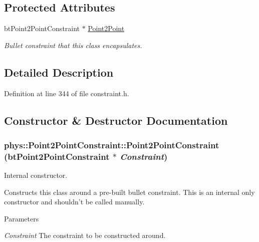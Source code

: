 \subsection*{Protected Attributes}
\begin{DoxyCompactItemize}
\item 
\hypertarget{classphys_1_1Point2PointConstraint_aa58b7fd9fe368c72d5bc5e1990bdf593}{
btPoint2PointConstraint $\ast$ \hyperlink{classphys_1_1Point2PointConstraint_aa58b7fd9fe368c72d5bc5e1990bdf593}{Point2Point}}
\label{da/dfb/classphys_1_1Point2PointConstraint_aa58b7fd9fe368c72d5bc5e1990bdf593}

\begin{DoxyCompactList}\small\item\em Bullet constraint that this class encapsulates. \item\end{DoxyCompactList}\end{DoxyCompactItemize}


\subsection{Detailed Description}


Definition at line 344 of file constraint.h.



\subsection{Constructor \& Destructor Documentation}
\hypertarget{classphys_1_1Point2PointConstraint_a73c530c760f31032e23955567f634978}{
\subsubsection[{Point2PointConstraint}]{\setlength{\rightskip}{0pt plus 5cm}phys::Point2PointConstraint::Point2PointConstraint (btPoint2PointConstraint $\ast$ {\em Constraint})}}
\label{da/dfb/classphys_1_1Point2PointConstraint_a73c530c760f31032e23955567f634978}


Internal constructor. 

Constructs this class around a pre-\/built bullet constraint. This is an internal only constructor and shouldn't be called manually. 
\begin{DoxyParams}{Parameters}
\item[{\em Constraint}]The constraint to be constructed around. \end{DoxyParams}


